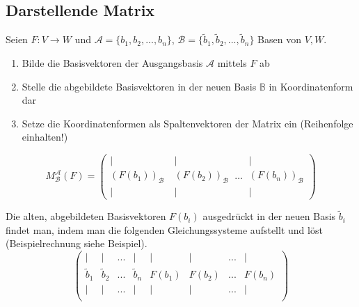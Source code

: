 \documentclass{article}
\begin{document}
\newpage


\subsection{Darstellende Matrix}
Seien $F:V\to W$ und $\mathcal{A} = \{b_1, b_2, ..., b_n\}$, $\mathcal{B} = \{\tilde{b}_1, \tilde{b}_2, ..., \tilde{b}_n\}$ Basen von $V,W$.
\begin{enumerate}
	\item Bilde die Basisvektoren der Ausgangsbasis $\mathcal{A}$ mittels $F$ ab
	\item Stelle die abgebildete Basisvektoren in der neuen Basis $\mathbb{B}$ in Koordinatenform dar
	\item Setze die Koordinatenformen als Spaltenvektoren der Matrix ein \textcolor{gruen}{(Reihenfolge einhalten!)}
\end{enumerate}

\begin{equation}
	M_{\mathcal{B}}^{\mathcal{A}}(F) =
			\left(
			\begin{matrix}
				|\\
				(F(b_1))_{\mathcal{B}}	\\
				|
			\end{matrix}\
			\begin{matrix}
				|\\
				(F(b_2))_{\mathcal{B}}	\\
				|
			\end{matrix}\
			\dots\
			\begin{matrix}
				|\\
				(F(b_n))_{\mathcal{B}}	\\
				|
			\end{matrix}	
			\right)
\end{equation}

Die alten, abgebildeten Basisvektoren $F(b_i)$ ausgedrückt in der neuen Basis $\tilde{b}_i$ findet man, indem man die folgenden Gleichungssysteme aufstellt und löst \textcolor{gruen}{(Beispielrechnung siehe Beispiel)}.
	\begin{equation}
		\left(\begin{array}{cccc|c|c|c|c}
			| & | & ... & | & | & | & ... & | \\
			\tilde{b}_1 & \tilde{b}_2 & ... & \tilde{b}_n & F(b_1) & F(b_2) & ... & F(b_n) \\
			| & | & ... & | & | & | & ... & | \\
		\end{array}\right)
	\end{equation}
\end{document}
